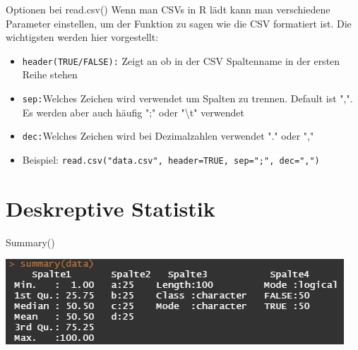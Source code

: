 \documentclass[xcolor=dvipsnames, aspectratio = 169]{beamer}
\begin{document}
\begin{frame}[fragile]{Optionen bei read.csv()}
Wenn man CSVs in R lädt kann man verschiedene Parameter einstellen, um der Funktion zu sagen wie die CSV formatiert ist. Die wichtigsten werden hier vorgestellt:
  \begin{itemize}
	  \item \verb +header(TRUE/FALSE):+ Zeigt an ob in der CSV Spaltenname in der ersten Reihe stehen
	  \item \verb +sep:+Welches Zeichen wird verwendet um Spalten zu trennen. Default ist ",". Es werden aber auch häufig ";" oder "\textbackslash t" verwendet
	  \item \verb +dec:+Welches Zeichen wird bei Dezimalzahlen verwendet "." oder ","
	  \item	Beispiel: \verb +read.csv("data.csv", header=TRUE, sep=";", dec=",")+
  \end{itemize}
\end{frame}

\section{Deskreptive Statistik}

\begin{frame}{Summary()}
	\begin{center}
		\includegraphics{Summary}
	\end{center}
\end{frame}
\end{document}
